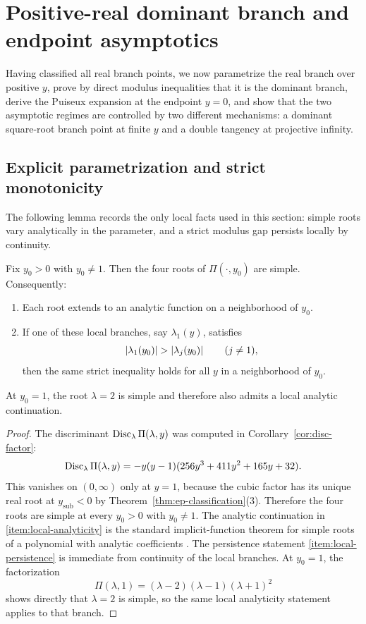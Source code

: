 \section{Positive-real dominant branch and endpoint asymptotics}\label{sec:physical-sheet}

Having classified all real branch points, we now parametrize the real branch over positive \(y\), prove by direct modulus inequalities that it is the dominant branch, derive the Puiseux expansion at the endpoint \(y=0\), and show that the two asymptotic regimes are controlled by two different mechanisms: a dominant square-root branch point at finite \(y\) and a double tangency at projective infinity.

\subsection{Explicit parametrization and strict monotonicity}

The following lemma records the only local facts used in this section:
simple roots vary analytically in the parameter, and a strict modulus gap persists locally by continuity.

\begin{lemma}\label{lem:local-simplicity-persistence}
Fix \(y_0>0\) with \(y_0\neq 1\).
Then the four roots of \(\Pi(\cdot,y_0)\) are simple.
Consequently:
\begin{enumerate}
\item\label{item:local-analyticity} Each root extends to an analytic function on a neighborhood of \(y_0\).
\item\label{item:local-persistence} If one of these local branches, say \(\lambda_1(y)\), satisfies
\[
\left\lvert \lambda_1(y_0)\right\rvert>\left\lvert \lambda_j(y_0)\right\rvert
\qquad (j\neq 1),
\]
then the same strict inequality holds for all \(y\) in a neighborhood of \(y_0\).
\end{enumerate}
At \(y_0=1\), the root \(\lambda=2\) is simple and therefore also admits a local analytic continuation.
\end{lemma}

\begin{proof}
The discriminant \(\operatorname{Disc}_\lambda\Pi(\lambda,y)\) was computed in Corollary~\ref{cor:disc-factor}:
\[
\operatorname{Disc}_\lambda\Pi(\lambda,y) = -y(y-1)(256y^3+411y^2+165y+32).
\]
This vanishes on \((0,\infty)\) only at \(y=1\), because the cubic factor has its unique real root at \(y_{\mathrm{sub}}<0\) by Theorem~\ref{thm:ep-classification}(3).
Therefore the four roots are simple at every \(y_0>0\) with \(y_0\neq1\).
The analytic continuation in \ref{item:local-analyticity} is the standard implicit-function theorem for simple roots of a polynomial with analytic coefficients \cite{Kato1976}.
The persistence statement \ref{item:local-persistence} is immediate from continuity of the local branches.
At \(y_0=1\), the factorization
\[
\Pi(\lambda,1)=(\lambda-2)(\lambda-1)(\lambda+1)^2
\]
shows directly that \(\lambda=2\) is simple, so the same local analyticity statement applies to that branch.
\end{proof}

